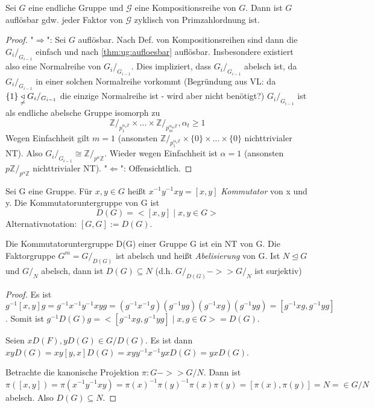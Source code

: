 \documentclass[../main.tex]{subfiles}
\begin{document}
\begin{theorem}
    Sei $G$ eine endliche Gruppe und $\mathcal{G}$ eine Kompositionsreihe von $G$. Dann ist $G$ auflösbar gdw. jeder Faktor von $\mathcal{G}$ zyklisch von Primzahlordnung ist.
\end{theorem}
\begin{proof}
    "$\Rightarrow$": Sei $G$ auflösbar. Nach Def. von Kompositionsreihen sind dann die $G_i/_{G_{i-1}}$ einfach und nach \cref{thm:ug:aufloesbar} auflösbar. Insbesondere existiert also eine Normalreihe von  $G_i/_{G_{i-1}}$. Dies impliziert, dass $G_i/_{G_{i-1}}$ abelsch ist, da $G_i/_{G_{i-1}}$ in einer solchen Normalreihe vorkommt (Begründung aus VL: da  $\{1\} \underset{\neq}{\triangleleft} G_i/_{G_{i-1}}$ die einzige Normalreihe ist - wird aber nicht benötigt?)
    $G_i/_{G_{i-1}}$ ist als endliche abelsche Gruppe isomorph zu
    $$\mathbb{Z}/_{p_1^{\alpha_1\mathbb{Z}}} \times ... \times \mathbb{Z}/_{p_m^{\alpha_m\mathbb{Z}}}, \alpha_t \geq 1$$
    Wegen Einfachheit gilt $m = 1$ (ansonsten $\mathbb{Z}/_{p_1^{\alpha_1\mathbb{Z}}} \times \{0\} \times ... \times \{0\}$ nichttrivialer NT). Also $G_i/_{G_{i-1}} \cong \mathbb{Z}/_{p^\alpha\mathbb{Z}}$. Wieder wegen Einfachheit ist $\alpha = 1$ (ansonsten $p \mathbb{Z}/_{p^\alpha\mathbb{Z}}$ nichttrivialer NT).
    "$\Leftarrow$": Offensichtlich.
\end{proof}
\begin{definition}[Kommutator]
    Sei G eine Gruppe. Für $x,y \in G$ heißt $x^{-1}y^{-1}xy = [x,y]$ \emph{Kommutator} von x und y. Die Kommutatoruntergruppe von G ist $$D(G) = <[x,y] \mid x,y \in G>$$
    Alternativnotation: $[G,G] := D(G)$.
\end{definition}
\begin{lemma}
    Die Kommutatoruntergruppe D(G) einer Gruppe G ist ein NT von G. Die Faktorgruppe $G^m = G/_{D(G)}$ ist abelsch und heißt \emph{Abelisierung} von G.
    Ist $N \trianglelefteq G$ und $G/_N$ abelsch, dann ist $D(G) \subseteq N$ (d.h. $G/_{D(G)} ->> G/_N$ ist surjektiv)
\end{lemma}
\begin{proof}
    Es ist $g^{-1}[x,y]g = g^{-1}x^{-1}y^{-1}xyg = (g^{-1}x^{-1}g)(g^{-1}yg)(g^{-1}xg)(g^{-1}yg) = [g^{-1}xg, g^{-1}yg]$. Somit ist $g^{-1}D(G)g = <[g^{-1}xg, g^{-1}yg] \mid x,g \in G> = D(G)$.
    
    Seien $xD(F), yD(G) \in G/D(G)$. Es ist dann $xyD(G) = xy[y,x]D(G) = xyy^{-1}x^{-1}yxD(G) = yxD(G)$. 
    
    Betrachte die kanonische Projektion $\pi: G ->> G/N$. Dann ist $\pi([x,y]) = \pi(x^{-1}y^{-1}xy) = \pi(x)^{-1}\pi(y)^{-1}\pi(x)\pi(y) = [\pi(x), \pi(y)] = N = \in G/N$ abelsch.
    Also $D(G) \subseteq N$.
\end{proof}
\end{document}

